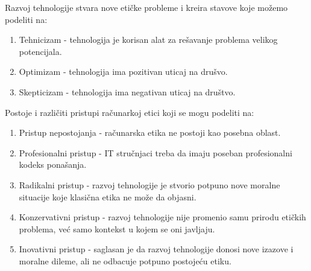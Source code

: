 \documentclass[12pt]{article}
\begin{document}
Razvoj tehnologije stvara nove etičke probleme i kreira stavove koje možemo podeliti na:
\begin{enumerate}
    \item Tehnicizam - tehnologija je korisan alat za rešavanje problema velikog potencijala.
    \item Optimizam - tehnologija ima pozitivan uticaj na drušvo.
    \item Skepticizam - tehnologija ima negativan uticaj na društvo.
\end{enumerate}

Postoje i različiti pristupi računarkoj etici koji se mogu podeliti na:
\begin{enumerate}
    \item Pristup nepostojanja - računarska etika ne postoji kao posebna oblast.
    \item Profesionalni pristup - IT stručnjaci treba da imaju poseban profesionalni kodeks ponašanja.
    \item Radikalni pristup - razvoj tehnologije je stvorio potpuno nove moralne situacije koje klasična etika ne može da objasni.
    \item Konzervativni pristup - razvoj tehnologije nije promenio samu prirodu etičkih problema, već samo kontekst u kojem se oni javljaju.
    \item Inovativni pristup - saglasan je da razvoj tehnologije donosi nove izazove i moralne dileme, ali ne odbacuje potpuno postojeću etiku.
\end{enumerate}
\end{document}
